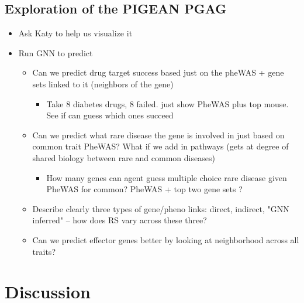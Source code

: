 \documentclass[sn-nature,lineno]{sn-jnl}%
\theoremstyle{thmstyleone}%
\theoremstyle{thmstyletwo}%
\theoremstyle{thmstylethree}%
\begin{document}
\subsection{Exploration of the PIGEAN PGAG}

\begin{itemize}
    \item Ask Katy to help us visualize it
    \item Run GNN to predict
    \begin{itemize}
        \item Can we predict drug target success based just on the pheWAS + gene sets linked to it (neighbors of the gene)
        \begin{itemize}
            \item Take 8 diabetes drugs, 8 failed. just show PheWAS plus top mouse. See if can guess which ones succeed
        \end{itemize}
        \item Can we predict what rare disease the gene is involved in just based on common trait PheWAS? What if we add in pathways (gets at degree of shared biology between rare and common diseases)
        \begin{itemize}
            \item How many genes can agent guess multiple choice rare disease given PheWAS for common? PheWAS + top two gene sets ?
        \end{itemize}
        \item Describe clearly three types of gene/pheno links: direct, indirect, "GNN inferred" -- how does RS vary across these three?
        \item Can we predict effector genes better by looking at neighborhood across all traits?
    \end{itemize}
\end{itemize}

\section{Discussion}
\end{document}
